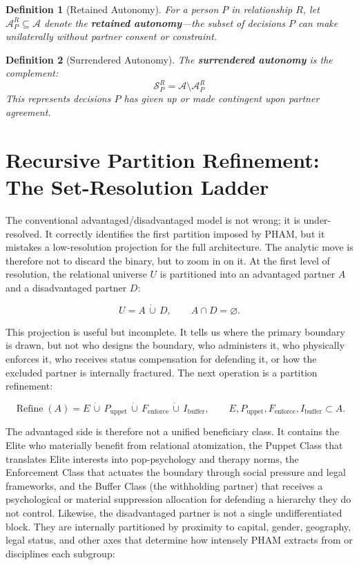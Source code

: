 \documentclass[12pt,openany]{book}
\newtheorem{definition}{Definition}[chapter]
\numberwithin{equation}{chapter}
\begin{document}
\begin{definition}[Retained Autonomy]
For a person $P$ in relationship $R$, let $\mathcal{A}_P^R \subseteq \mathcal{A}$ denote the \textbf{retained autonomy}---the subset of decisions $P$ can make unilaterally without partner consent or constraint.
\end{definition}

\begin{definition}[Surrendered Autonomy]
The \textbf{surrendered autonomy} is the complement:
\[
\mathcal{S}_P^R = \mathcal{A} \setminus \mathcal{A}_P^R
\]
This represents decisions $P$ has given up or made contingent upon partner agreement.
\end{definition}

\section{Recursive Partition Refinement: The Set-Resolution Ladder}
\label{sec:binary-refinement}

The conventional advantaged/disadvantaged model is not wrong; it is under-resolved.
It correctly identifies the first partition imposed by PHAM, but
it mistakes a low-resolution projection for the full architecture. The analytic
move is therefore not to discard the binary, but to zoom in on it.
At the first level of resolution, the relational universe $U$ is partitioned into
an advantaged partner $A$ and a disadvantaged partner $D$:

\begin{equation}\label{eq:binary-partition}
U = A \,\dot\cup\, D,
\qquad
A \cap D = \varnothing .
\end{equation}

This projection is useful but incomplete. It tells us where the primary
boundary is drawn, but not who designs the boundary, who administers it, who
physically enforces it, who receives status compensation for defending it, or
how the excluded partner is internally fractured. The next operation is a
partition refinement:

\begin{equation}\label{eq:refined-five-tier-partition}
\operatorname{Refine}(A)
=
E \,\dot\cup\, P_{\text{uppet}} \,\dot\cup\, F_{\text{enforce}}
\,\dot\cup\, I_{\text{buffer}},
\qquad
E, P_{\text{uppet}}, F_{\text{enforce}}, I_{\text{buffer}} \subset A .
\end{equation}

The advantaged side is therefore not a unified beneficiary class. It contains the
Elite who materially benefit from relational atomization, the Puppet Class that translates Elite interests
into pop-psychology and therapy norms, the Enforcement Class that actuates the boundary through social pressure and legal frameworks, and the Buffer Class (the withholding partner) that receives a psychological or material suppression allocation
for defending a hierarchy they do not control. Likewise, the disadvantaged partner is not a
single undifferentiated block. They are internally partitioned by proximity
to capital, gender, geography, legal status, and other axes that determine how intensely PHAM extracts from or
disciplines each subgroup:
\end{document}
